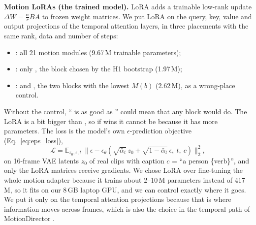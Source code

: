 \documentclass[twoside,english]{article}
\begin{document}
\textbf{Motion LoRAs (the trained model).} LoRA \citep{hu2022lora} adds a trainable low-rank update
$\Delta W = \frac{\alpha}{r}BA$ to frozen weight matrices. We put LoRA on the query, key, value and output
projections of the temporal attention layers, in three placements with the same rank, data and number
of steps:
\begin{itemize}
\item {}: all 21 motion modules (9.67\,M trainable parameters);
\item {}: only , the block chosen by the H1 bootstrap (1.97\,M);
\item {}:  and , the two blocks with the lowest $M(b)$ (2.62\,M),
  as a wrong-place control.
\end{itemize}
Without the control, `` is as good as '' could mean that any block would do. The
 LoRA is a bit bigger than , so if  wins it cannot be because it has
more parameters. The loss is the model's own $\epsilon$-prediction objective (Eq.~\eqref{eq:eps_loss}),
\begin{equation}
\mathcal{L} = \mathbb{E}_{z_0, \epsilon, t}\,\big\| \epsilon - \epsilon_\theta(\sqrt{\bar\alpha_t}\,z_0 + \sqrt{1-\bar\alpha_t}\,\epsilon,\ t,\ c) \big\|_2^2,
\end{equation}
on 16-frame VAE latents $z_0$ of real clips with caption $c$ = ``a person \{verb\}'', and only the LoRA
matrices receive gradients. We chose LoRA over fine-tuning the whole motion adapter because it trains
about 2--10\,M parameters instead of 417\,M, so it fits on our 8\,GB laptop GPU, and we can control
exactly where it goes. We put it only on the temporal attention projections because that is where
information moves across frames, which is also the choice in the temporal path of MotionDirector
\citep{zhao2024motiondirector}.
\end{document}
